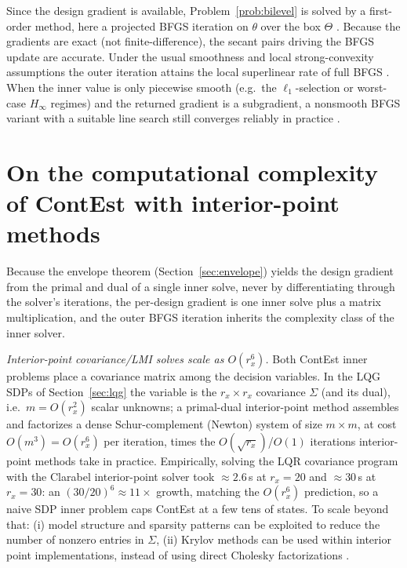 \documentclass[twocolumn,amsthm]{autart}
\begin{document}
\begin{rem}\label{rem:algorithm}
Since the design gradient is available,
Problem~\ref{prob:bilevel} is solved by a first-order method, here a projected
BFGS iteration on $\theta$ over the box $\Theta$
\cite{nocedal2006numerical}. Because the gradients are
exact (not finite-difference), the
secant pairs driving the BFGS update are accurate. Under the usual smoothness
and local strong-convexity assumptions the outer iteration attains the local
superlinear rate of full BFGS \cite{nocedal2006numerical}. When the inner value
is only piecewise smooth (e.g.\ the $\ell_1$-selection or worst-case $H_\infty$
regimes) and the returned gradient is a subgradient, a nonsmooth BFGS variant
with a suitable line search still converges reliably in practice
\cite{lewis2013nonsmooth}.
\end{rem}



\section{On the computational complexity of ContEst with interior-point methods}
\label{sec:sim:complexity}

Because the envelope theorem (Section~\ref{sec:envelope}) yields the design
gradient from the primal and dual of a single inner solve, never by
differentiating through the solver's iterations, the per-design gradient is one inner
solve plus a matrix multiplication, and the outer BFGS iteration inherits the
complexity class of the inner solver.

\emph{Interior-point covariance/LMI solves scale as $O(r_x^6)$.} Both ContEst
inner problems place a covariance matrix among the decision variables. In the LQG
SDPs of Section~\ref{sec:lqg} the variable is the $r_x\times r_x$ covariance
$\Sigma$ (and its dual), i.e.\ $m=O(r_x^2)$ scalar unknowns; a primal-dual
interior-point method assembles and factorizes a dense Schur-complement (Newton)
system of size $m\times m$, at cost $O(m^3)=O(r_x^6)$ per iteration, times the
$O(\sqrt{r_x})$/$O(1)$ iterations interior-point methods take in practice. Empirically, solving the LQR
covariance program with the Clarabel interior-point solver took
$\approx\!2.6\,$s at $r_x=20$ and $\approx\!30\,$s at $r_x=30$: an
$(30/20)^6\!\approx\!11\times$ growth, matching the $O(r_x^6)$ prediction, so a
naive SDP inner problem caps ContEst at a few tens of states. To scale beyond that: (i) model structure and sparsity patterns can be exploited to reduce the number of nonzero entries in $\Sigma$, (ii) Krylov methods can be used within interior point implementations, instead of using direct Cholesky factorizations \cite{gondzio2012interior}.
\end{document}
